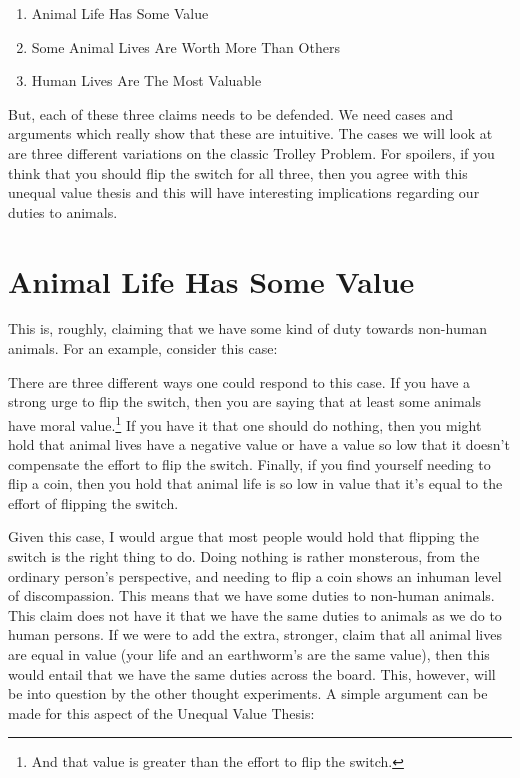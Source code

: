 \begin{enumerate}
\item Animal Life Has Some Value
\item Some Animal Lives Are Worth More Than Others
\item Human Lives Are The Most Valuable
\end{enumerate}

But, each of these three claims needs to be defended. We need cases and arguments which really show that these are intuitive. The cases we will look at are three different variations on the classic Trolley Problem. For spoilers, if you think that you should flip the switch for all three, then you agree with this unequal value thesis and this will have interesting implications regarding our duties to animals. 

\section{Animal Life Has Some Value}

This is, roughly, claiming that we have some kind of duty towards non-human animals. For an example, consider this case:  


There are three different ways one could respond to this case. If you have a strong urge to flip the switch, then you are saying that at least some animals have moral value.\footnote{And that value is greater than the effort to flip the switch.} If you have it that one should do nothing, then you might hold that animal lives have a negative value or have a value so low that it doesn't compensate the effort to flip the switch. Finally, if you find yourself needing to flip a coin, then you hold that animal life is so low in value that it's equal to the effort of flipping the switch. 

Given this case, I would argue that most people would hold that flipping the switch is the right thing to do. Doing nothing is rather monsterous, from the ordinary person's perspective, and needing to flip a coin shows an inhuman level of discompassion. This means that we have some duties to non-human animals. This claim does not have it that we have the same duties to animals as we do to human persons. If we were to add the extra, stronger, claim that all animal lives are equal in value (your life and an earthworm's are the same value), then this would entail that we have the same duties across the board. This, however, will be into question by the other thought experiments. A simple argument can be made for this aspect of the Unequal Value Thesis: 

